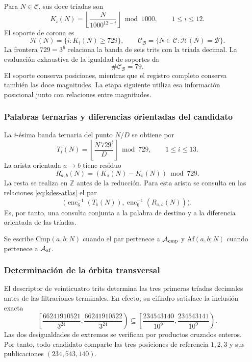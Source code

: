 Para $N\in\mathcal C$, sus doce tríadas son
\begin{equation}
 K_i(N)=\left\lfloor\frac{N}{1000^{12-i}}\right\rfloor\bmod1000,
 \qquad1\leq i\leq12.
 \label{eq:kdes-triadas}
\end{equation}
El soporte de corona es
\[
 \mathcal H(N)=\{i:K_i(N)\geq729\},
 \qquad
 \mathcal C_{\mathcal B}=\{N\in\mathcal C:\mathcal H(N)=\mathcal B\}.
\]
La frontera $729=3^6$ relaciona la banda de seis trits con la tríada
decimal. La evaluación exhaustiva de la igualdad de soportes da
\begin{equation}
 \#\mathcal C_{\mathcal B}=79.
 \label{eq:kdes-79}
\end{equation}
El soporte conserva posiciones, mientras que el registro completo
conserva también las doce magnitudes. La etapa siguiente utiliza esa
información posicional junto con relaciones entre magnitudes.

\subsubsection{Palabras ternarias y diferencias orientadas del candidato}

La $i$-ésima banda ternaria del punto $N/D$ se obtiene por
\begin{equation}
 T_i(N)=\left\lfloor\frac{N\,729^i}{D}\right\rfloor\bmod729,
 \qquad1\leq i\leq13.
 \label{eq:kdes-tercandidato}
\end{equation}
La arista orientada $a\to b$ tiene residuo
\begin{equation}
 R_{a,b}(N)=(K_a(N)-K_b(N))\bmod729.
 \label{eq:kdes-resarista}
\end{equation}
La resta se realiza en $\mathbb Z$ antes de la reducción. Para esta
arista se consulta en las relaciones \eqref{eq:kdes-atlas} el par
\[
 \bigl(\operatorname{enc}_6^{-1}(T_b(N)),
  \operatorname{enc}_6^{-1}(R_{a,b}(N))\bigr).
\]
Es, por tanto, una consulta
conjunta a la palabra de destino y a la diferencia orientada de las
tríadas.

Se escribe $\mathrm{Cmp}(a,b;N)$ cuando el par pertenece a
$\mathcal A_{\rm cmp}$ y $\mathrm{Af}(a,b;N)$ cuando pertenece a
$\mathcal A_{\rm af}$.

\subsubsection{Determinación de la órbita transversal}

El descriptor de veinticuatro trits determina las tres primeras
tríadas decimales antes de las filtraciones terminales. En efecto, su
cilindro satisface la inclusión exacta
\[
 \left[\frac{66241910521}{3^{24}},
       \frac{66241910522}{3^{24}}\right)
 \subseteq
 \left[\frac{234543140}{10^9},
       \frac{234543141}{10^9}\right).
\]
Las dos desigualdades de extremos se verifican por productos cruzados
enteros. Por tanto, todo candidato comparte las tres posiciones de
referencia $1,2,3$ y sus publicaciones $(234,543,140)$.


